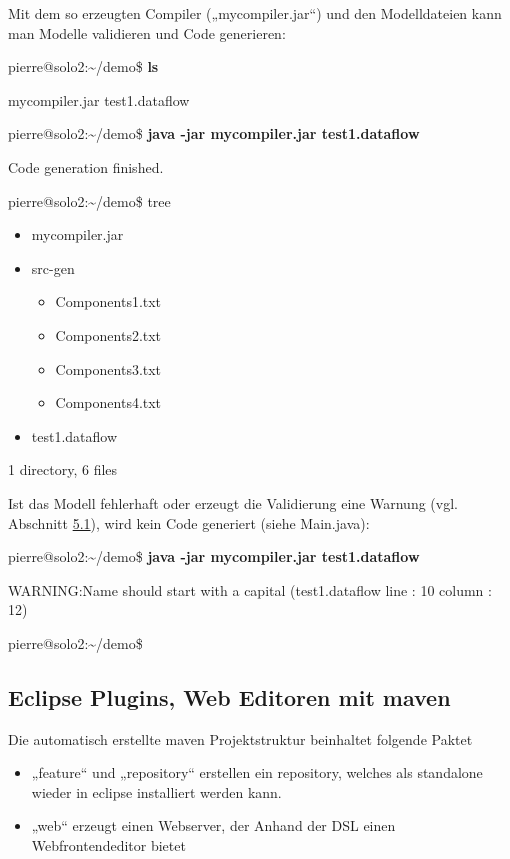 \documentclass[]{article}
\providecommand{\tightlist}{%
  \setlength{\itemsep}{0pt}\setlength{\parskip}{0pt}}
\begin{document}
Mit dem so erzeugten Compiler („mycompiler.jar``) und den Modelldateien
kann man Modelle validieren und Code generieren:

pierre@solo2:\textasciitilde{}/demo\$ \textbf{ls}

mycompiler.jar test1.dataflow

pierre@solo2:\textasciitilde{}/demo\$ \textbf{java -jar mycompiler.jar
test1.dataflow }

Code generation finished.

pierre@solo2:\textasciitilde{}/demo\$ tree

\begin{itemize}
\item mycompiler.jar
\item src-gen
\begin{itemize}
\item Components1.txt
\item Components2.txt
\item Components3.txt
\item Components4.txt
\end{itemize}
\item test1.dataflow
\end{itemize}
1 directory, 6 files

Ist das Modell fehlerhaft oder erzeugt die Validierung eine Warnung
(vgl. Abschnitt \protect\hyperlink{anchor-30}{5.1}), wird kein Code
generiert (siehe Main.java):

pierre@solo2:\textasciitilde{}/demo\$ \textbf{java -jar mycompiler.jar
test1.dataflow }

WARNING:Name should start with a capital (test1.dataflow line : 10
column : 12)

pierre@solo2:\textasciitilde{}/demo\$

\subsection[Eclipse Plugins, Web Editoren mit
maven]{\texorpdfstring{\protect\hypertarget{anchor-51}{}{}Eclipse
Plugins, Web Editoren mit
maven}{Eclipse Plugins, Web Editoren mit maven}}\label{eclipse-plugins-web-editoren-mit-maven}

Die automatisch erstellte maven Projektstruktur beinhaltet folgende
Paktet

\begin{itemize}
\tightlist
\item
  „feature`` und „repository`` erstellen ein repository, welches als
  standalone wieder in eclipse installiert werden kann. 
\item
  „web`` erzeugt einen Webserver, der Anhand der DSL einen
  Webfrontendeditor bietet
\end{itemize}
\end{document}
